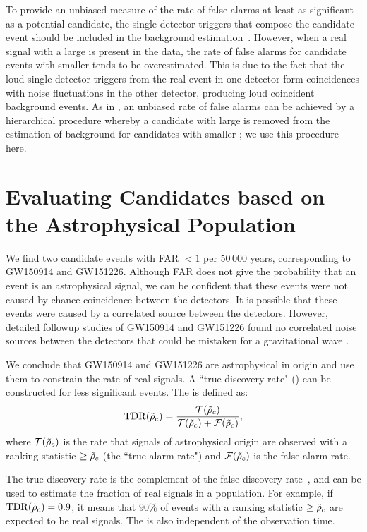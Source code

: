 To provide an unbiased measure of the rate of false alarms at least as significant as a potential candidate, the single-detector triggers that compose the candidate event should be included in the background estimation~\citep{2017PhRvD..96h2002C}. However, when a real signal with a large \rankingstat{} is present in the data, the rate of false alarms for candidate events with smaller \rankingstat{} tends to be overestimated. This is due to the fact that the loud single-detector triggers from the real event in one detector form coincidences with noise fluctuations in the other detector, producing loud coincident background events. As in \cite{TheLIGOScientific:2016pea}, an unbiased rate of false alarms can be achieved by a hierarchical procedure whereby a candidate with large \rankingstat{} is removed from the estimation of background for candidates with smaller \rankingstat{}; we use this procedure here.

\section{Evaluating Candidates based on the Astrophysical Population}
\label{sec:tdr} 

We find two candidate events with
FAR $< 1$ per $50\,000$ years, corresponding to GW150914 and GW151226.
Although FAR does not give the probability that an event is an astrophysical signal,
we can be confident that these events were not caused by chance
coincidence between the detectors. It is possible that these
events were caused by a correlated source between the detectors. However, detailed followup
studies of GW150914 and GW151226 found no correlated noise sources between the detectors
that could be mistaken for a gravitational wave \citep{TheLIGOScientific:2016zmo, Abbott:2016nmj}.

We conclude that GW150914 and GW151226 are astrophysical in origin and use them to constrain the rate of real signals. A ``true discovery rate"
(\tdr{}) can be constructed for less significant events. The \tdr{} is defined as:
%
\begin{equation}
\mathrm{TDR}(\tilde{\rho}_c) = \frac{\mathcal{T}(\tilde{\rho}_c)}{\mathcal{T}(\tilde{\rho}_c) + \mathcal{F}(\tilde{\rho}_c)},
\end{equation}
%
where $\mathcal{T}(\tilde{\rho}_c)$ is the rate that signals of astrophysical origin are observed with
a ranking statistic $\geq \tilde{\rho}_c$ (the ``true alarm rate") and
$\mathcal{F}(\tilde{\rho}_c)$ is the false alarm rate.

The true discovery rate is the complement of the false discovery rate~\citep{Benjamini:1995ram},
and can be used to estimate the fraction of real signals in a population.
For example, if $\mathrm{TDR}(\tilde{\rho}_c) = 0.9$, it means that
$90\%$ of events with a ranking statistic $\geq \tilde{\rho}_c$ are expected to be real signals.  The
\tdr{} is also independent of the observation time.

